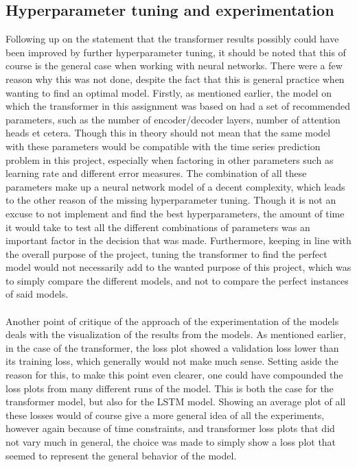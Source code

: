 \documentclass[main.tex]{subfiles}
\begin{document}
\subsection{Hyperparameter tuning and experimentation}
Following up on the statement that the transformer results possibly could have been improved by further hyperparameter tuning, it should be noted that this of course is the general case when working with neural networks. There were a few reason why this was not done, despite the fact that this is general practice when wanting to find an optimal model. Firstly, as mentioned earlier, the model on which the transformer in this assignment was based on had a set of recommended parameters, such as the number of encoder/decoder layers, number of attention heads et cetera. Though this in theory should not mean that the same model with these parameters would be compatible with the time series prediction problem in this project, especially when factoring in other parameters such as learning rate and different error measures. The combination of all these parameters make up a neural network model of a decent complexity, which leads to the other reason of the missing hyperparameter tuning. Though it is not an excuse to not implement and find the best hyperparameters, the amount of time it would take to test all the different combinations of parameters was an important factor in the decision that was made. Furthermore, keeping in line with the overall purpose of the project, tuning the transformer to find the perfect model would not necessarily add to the wanted purpose of this project, which was to simply compare the different models, and not to compare the perfect instances of said models.\\
\\
Another point of critique of the approach of the experimentation of the models deals with the visualization of the results from the models. As mentioned earlier, in the case of the transformer, the loss plot showed a validation loss lower than its training loss, which generally would not make much sense. Setting aside the reason for this, to make this point even clearer, one could have compounded the loss plots from many different runs of the model. This is both the case for the transformer model, but also for the LSTM model. Showing an average plot of all these losses would of course give a more general idea of all the experiments, however again because of time constraints, and transformer loss plots that did not vary much in general, the choice was made to simply show a loss plot that seemed to represent the general behavior of the model.
\end{document}
